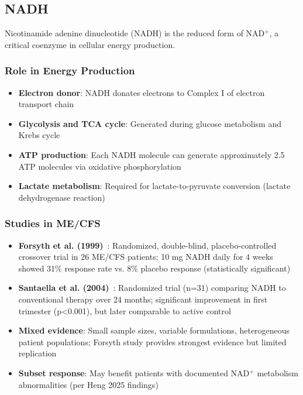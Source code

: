 \subsection{NADH}

Nicotinamide adenine dinucleotide (NADH) is the reduced form of NAD$^+$, a critical coenzyme in cellular energy production.

\subsubsection{Role in Energy Production}

\begin{itemize}
    \item \textbf{Electron donor}: NADH donates electrons to Complex I of electron transport chain
    \item \textbf{Glycolysis and TCA cycle}: Generated during glucose metabolism and Krebs cycle
    \item \textbf{ATP production}: Each NADH molecule can generate approximately 2.5 ATP molecules via oxidative phosphorylation
    \item \textbf{Lactate metabolism}: Required for lactate-to-pyruvate conversion (lactate dehydrogenase reaction)
\end{itemize}

\subsubsection{Studies in ME/CFS}

\begin{itemize}
    \item \textbf{Forsyth et al. (1999)}~\cite{Forsyth1999NADH}: Randomized, double-blind, placebo-controlled crossover trial in 26 ME/CFS patients; 10 mg NADH daily for 4 weeks showed 31\% response rate vs. 8\% placebo response (statistically significant)
    \item \textbf{Santaella et al. (2004)}~\cite{Santaella2004NADH}: Randomized trial (n=31) comparing NADH to conventional therapy over 24 months; significant improvement in first trimester (p<0.001), but later comparable to active control
    \item \textbf{Mixed evidence}: Small sample sizes, variable formulations, heterogeneous patient populations; Forsyth study provides strongest evidence but limited replication
    \item \textbf{Subset response}: May benefit patients with documented NAD$^+$ metabolism abnormalities (per Heng 2025 findings)~\cite{heng2025mecfs}
\end{itemize}

